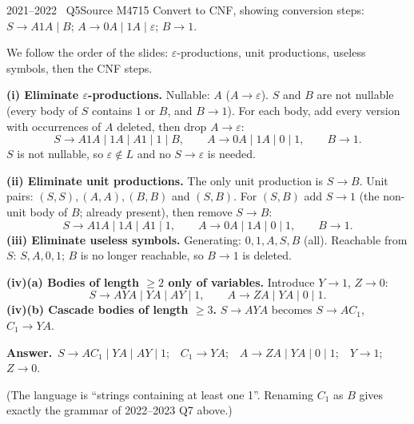\documentclass[11pt,a4paper]{article}
\newcommand{\eps}{\varepsilon}
\newcommand{\ans}[1]{\par\smallskip\noindent\colorbox{mist}{\parbox{\dimexpr\linewidth-2\fboxsep}{\sffamily\small\textbf{\color{teal}Answer.}\ \color{ink}#1}}\par}
\begin{document}
\begin{question}{2021--2022 \textbullet\ Q5}{Source M47}{15}
Convert to CNF, showing conversion steps: $S\to A1A\mid B$; $A\to0A\mid1A\mid\eps$; $B\to1$.
\end{question}
\begin{solution}
We follow the order of the slides: $\eps$-productions, unit productions, useless symbols, then the CNF steps.

\textbf{(i) Eliminate $\eps$-productions.} Nullable: $A$ ($A\to\eps$). $S$ and $B$ are not nullable (every body of $S$ contains $1$ or $B$, and $B\to1$). For each body, add every version with occurrences of $A$ deleted, then drop $A\to\eps$:
\[ S\to A1A\mid 1A\mid A1\mid 1\mid B,\qquad A\to0A\mid1A\mid0\mid1,\qquad B\to1. \]
$S$ is not nullable, so $\eps\notin L$ and no $S\to\eps$ is needed.

\textbf{(ii) Eliminate unit productions.} The only unit production is $S\to B$. Unit pairs: $(S,S),(A,A),(B,B)$ and $(S,B)$. For $(S,B)$ add $S\to1$ (the non-unit body of $B$; already present), then remove $S\to B$:
\[ S\to A1A\mid 1A\mid A1\mid 1,\qquad A\to0A\mid1A\mid0\mid1,\qquad B\to1. \]
\textbf{(iii) Eliminate useless symbols.} Generating: $0,1,A,S,B$ (all). Reachable from $S$: $S,A,0,1$; $B$ is no longer reachable, so $B\to1$ is deleted.

\textbf{(iv)(a) Bodies of length $\ge2$ only of variables.} Introduce $Y\to1$, $Z\to0$:
\[ S\to AYA\mid YA\mid AY\mid1,\qquad A\to ZA\mid YA\mid0\mid1. \]
\textbf{(iv)(b) Cascade bodies of length $\ge3$.} $S\to AYA$ becomes $S\to AC_1$, $C_1\to YA$.

\ans{$S\to AC_1\mid YA\mid AY\mid1$;\ \ $C_1\to YA$;\ \ $A\to ZA\mid YA\mid0\mid1$;\ \ $Y\to1$;\ \ $Z\to0$.}
(The language is ``strings containing at least one 1''. Renaming $C_1$ as $B$ gives exactly the grammar of 2022--2023 Q7 above.)
\end{solution}
\end{document}
